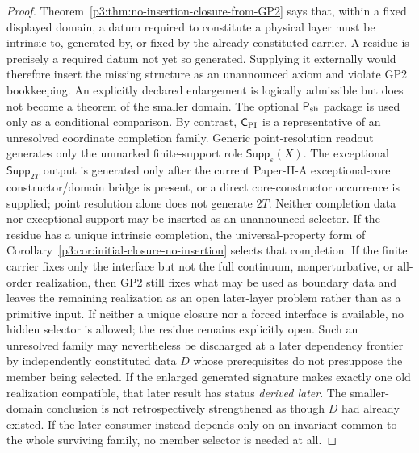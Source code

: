 \documentclass[11pt,a4paper]{article}
\begin{document}
\begin{proof}
Theorem~\ref{p3:thm:no-insertion-closure-from-GP2} says that, within a fixed
displayed domain, a datum required
to constitute a physical layer must be intrinsic to, generated by, or fixed by
the already constituted carrier.  A residue is precisely a required datum not
yet so generated.  Supplying it externally would therefore insert the missing
structure as an unannounced axiom and violate GP2 bookkeeping.  An explicitly
declared enlargement is logically admissible but does not become a theorem of
the smaller domain.  The optional \(\mathsf P_{\rm sli}\) package is used
only as a conditional comparison.  By contrast,
\(\mathsf C_{\rm PI}\) is a representative of an unresolved coordinate
completion family.  Generic point-resolution readout generates only the
unmarked finite-support role \(\mathsf{Supp}_{\varepsilon}(X)\).  The
exceptional \(\mathsf{Supp}_{2T}\) output is generated only after the
current Paper-II-A exceptional-core constructor/domain bridge is present, or
a direct core-constructor occurrence is supplied; point resolution alone does
not generate \(2T\).  Neither completion data nor exceptional support may be
inserted as an unannounced selector.  If the residue has a unique intrinsic
completion, the universal-property form of Corollary~\ref{p3:cor:initial-closure-no-insertion}
selects that completion.  If the finite carrier fixes only the interface but
not the full continuum, nonperturbative, or all-order realization, then GP2
still fixes what may be used as boundary data and leaves the remaining
realization as an open later-layer problem rather than as a primitive input.
If neither a unique closure nor a forced interface is available, no hidden
selector is allowed; the residue remains explicitly open.  Such an unresolved
family may nevertheless be discharged at a later dependency frontier by
independently constituted data \(D\) whose prerequisites do not presuppose the
member being selected.  If the enlarged generated signature makes exactly one
old realization compatible, that later result has status \emph{derived later}.
The smaller-domain conclusion is not retrospectively strengthened as
though \(D\) had already existed.  If the later consumer instead depends only
on an invariant common to the whole surviving family, no member selector is
needed at all.
\end{proof}
\end{document}

